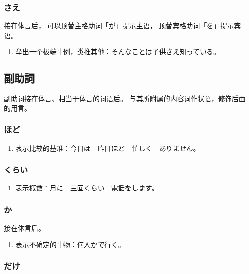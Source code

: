 \subsubsection{さえ}%

接在体言后，
可以顶替主格助词「が」提示主语，
顶替宾格助词「を」提示宾语。
\begin{enumerate}
  \item 举出一个极端事例，类推其他：そんなことは子供さえ知っている。
\end{enumerate}




\subsection{副助詞}%

副助词接在体言、相当于体言的词语后。
与其所附属的内容词作状语，修饰后面的用言。


\subsubsection{ほど}%

\begin{enumerate}
  \item 表示比较的基准：今日は　昨日ほど　忙しく　ありません。
\end{enumerate}


\subsubsection{くらい}%

\begin{enumerate}
  \item 表示概数：月に　三回くらい　電話をします。
\end{enumerate}


\subsubsection{か}%

接在体言后。
\begin{enumerate}
  \item 表示不确定的事物：何人かで行く。
\end{enumerate}


\subsubsection{だけ}%

